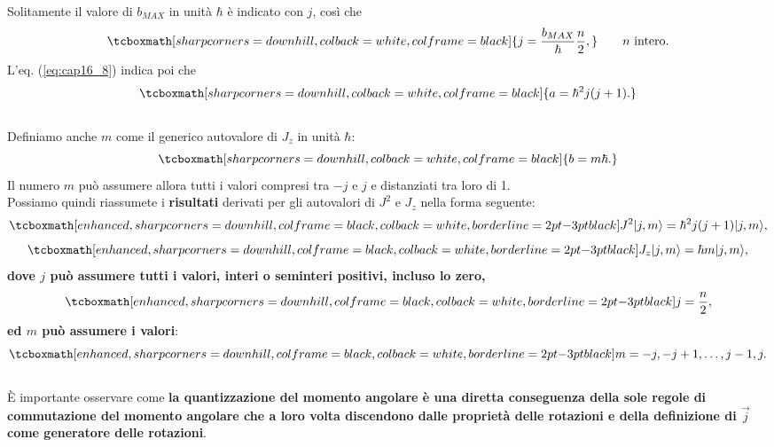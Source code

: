 Solitamente il valore di $b_{MAX}$ in unità $\hbar$ è indicato con $j$, così che
	\begin{equation}
		\tcboxmath[sharp corners=downhill, colback=white, colframe=black]{
			j= \frac{b_{MAX}}{\hbar} \frac{n}{2},
			} \qquad n \textrm{ intero.}
	\end{equation}
L'eq. (\ref{eq:cap16_8}) indica poi che
	\begin{equation}
		\tcboxmath[sharp corners=downhill, colback=white, colframe=black]{
			a= \hbar ^2 j(j+1).
			}
	\end{equation}\\

Definiamo anche $m$ come il generico autovalore di $J_z$ in unità $\hbar$:
	\begin{equation}
		\tcboxmath[sharp corners=downhill, colback=white, colframe=black]{
			b=m\hbar .
			}
	\end{equation}
Il numero $m$ può assumere allora tutti i valori compresi tra $-j$ e $j$ e distanziati tra loro di 1.\\

Possiamo quindi riassumete i \textbf{risultati} derivati per gli autovalori di $J^2$ e $J_z$ nella forma seguente:
	\begin{equation}
		 \tcboxmath[enhanced, sharp corners=downhill, colframe=black, colback=white, borderline={2pt}{-3pt}{black}]{
		 	J^2\vert j, m \rangle =\hbar ^2 j (j+1)\vert j, m \rangle , 
		 	}
	\end{equation}
	\begin{equation}
		 \tcboxmath[enhanced, sharp corners=downhill, colframe=black, colback=white, borderline={2pt}{-3pt}{black}]{
		 	J_z\vert j, m \rangle =\hbar  m\vert j, m \rangle ,
		 	}
	\end{equation}
\textbf{dove $j$ può assumere tutti i valori, interi o seminteri positivi, incluso  lo zero,}
	\begin{equation}
		\tcboxmath[enhanced, sharp corners=downhill, colframe=black, colback=white, borderline={2pt}{-3pt}{black}]{
			j= \frac{n}{2},
			}
	\end{equation}
\textbf{ed $m$ può assumere i valori}:
	\begin{equation}
		\tcboxmath[enhanced, sharp corners=downhill, colframe=black, colback=white, borderline={2pt}{-3pt}{black}]{
			m=-j, -j+1,\dots , j-1, j.
			}
	\end{equation}\\
	
È importante osservare come \textbf{la quantizzazione del momento angolare è una diretta conseguenza della sole regole di commutazione del momento  angolare che a loro volta discendono dalle proprietà delle rotazioni e della definizione di $\vec{j}$ come generatore delle rotazioni}.\\

